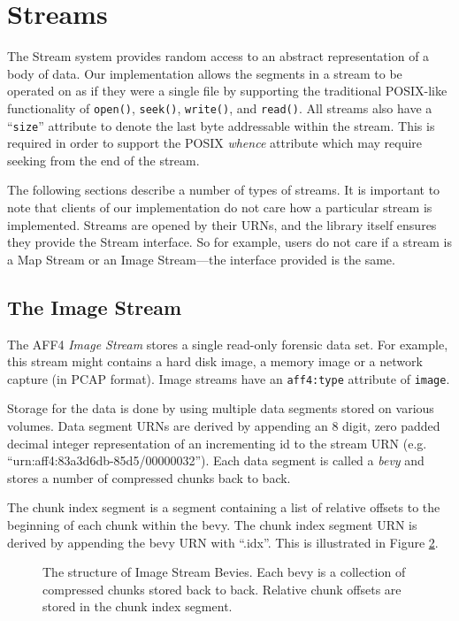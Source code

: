 \documentclass[10pt, conference]{IEEEtran}
\begin{document}
{{\begin{figure}[tbp]
\begin{center}
  \label{explorer}
  \end{center}
\end{figure}


\section{Streams}
The Stream system provides random access to an abstract representation
of a body of data. Our implementation allows the segments in a stream
to be operated on as if they were a single file by supporting the
traditional POSIX-like functionality of
\texttt{open()}, \texttt{seek()}, \texttt{write()}, and
\texttt{read()}. All streams also have a ``\texttt{size}'' attribute
to denote the last byte addressable within the stream. This is
required in order to support the POSIX \emph{whence} attribute which
may require seeking from the end of the stream.

The following sections describe a number of types of streams. It is
important to note that clients of our implementation do not care how a
particular stream is implemented. Streams are opened by their URNs,
and the library itself ensures they provide the Stream interface. So
for example, users do not care if a stream is a Map Stream or an Image
Stream---the interface provided is the same.

\subsection{The Image Stream}
\label{image_stream}
The AFF4 \emph{Image Stream} stores a single read-only forensic data
set. For example, this stream might contains a hard disk image, a
memory image or a network capture (in PCAP format). Image streams have
an \texttt{aff4:type} attribute of \texttt{image}.

Storage for the data is done by using multiple data segments stored on
various volumes. Data segment URNs are derived by appending an 8
digit, zero padded decimal integer representation of an incrementing
id to the stream URN (e.g. ``urn:aff4:83a3d6db-85d5/00000032''). Each
data segment is called a \emph{bevy} and stores a number of compressed
chunks back to back.

The chunk index segment is a segment containing a list of relative
offsets to the beginning of each chunk within the bevy. The chunk
index segment URN is derived by appending the bevy URN with
``.idx''. This is illustrated in Figure \ref{image_stream_bevy}.

\begin{figure}[tb]
  \begin{center}
  \mbox{\columnwidth {}}
  \caption{The structure of Image Stream Bevies. Each bevy is a
collection of compressed chunks stored back to back. Relative chunk
offsets are stored in the chunk index segment.}
  \label{image_stream_bevy}
  \end{center}
\end{figure}

}}
\end{document}
